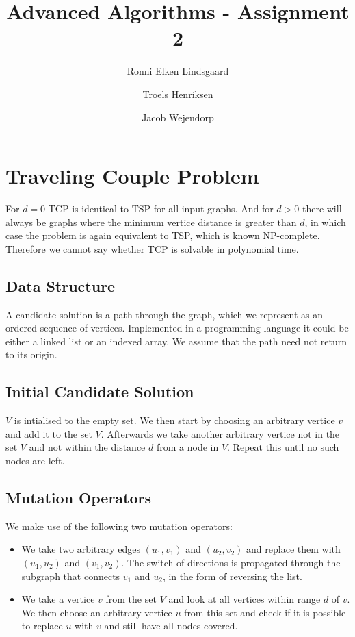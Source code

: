 \documentclass{article}
\title{Advanced Algorithms - Assignment 2}
\author{Ronni Elken Lindsgaard\and
Troels Henriksen\and
Jacob Wejendorp}
\begin{document}
\maketitle
\section{Traveling Couple Problem}
For $d=0$ TCP is identical to TSP for all input graphs. And for $d > 0$
there will always be graphs where the minimum vertice distance is
greater than $d$, in which case the problem is again equivalent to TSP, which
is known NP-complete. Therefore we cannot say whether TCP is solvable in
polynomial time.

\subsection{Data Structure}

A candidate solution is a path through the graph, which we represent
as an ordered sequence of vertices.  Implemented in a programming
language it could be either a linked list or an indexed array.  We
assume that the path need not return to its origin.

\subsection{Initial Candidate Solution}

$V$ is intialised to the empty set. We then start by choosing an
arbitrary vertice $v$ and add it to the set $V$.  Afterwards we take
another arbitrary vertice not in the set $V$ and not within the
distance $d$ from a node in $V$.  Repeat this until no such nodes are
left.

\subsection{Mutation Operators}

We make use of the following two mutation operators:

\begin{itemize}
\item We take two arbitrary edges $(u_1,v_1)$ and $(u_2,v_2)$ and
  replace them with $(u_1,u_2)$ and $(v_1,v_2)$. The switch of
  directions is propagated through the subgraph that connects $v_1$
  and $u_2$, in the form of reversing the list.
\item We take a vertice $v$ from the set $V$ and look at all vertices
  within range $d$ of $v$. We then choose an arbitrary vertice $u$
  from this set and check if it is possible to replace $u$ with $v$
  and still have all nodes covered.
\end{itemize}
\end{document}
